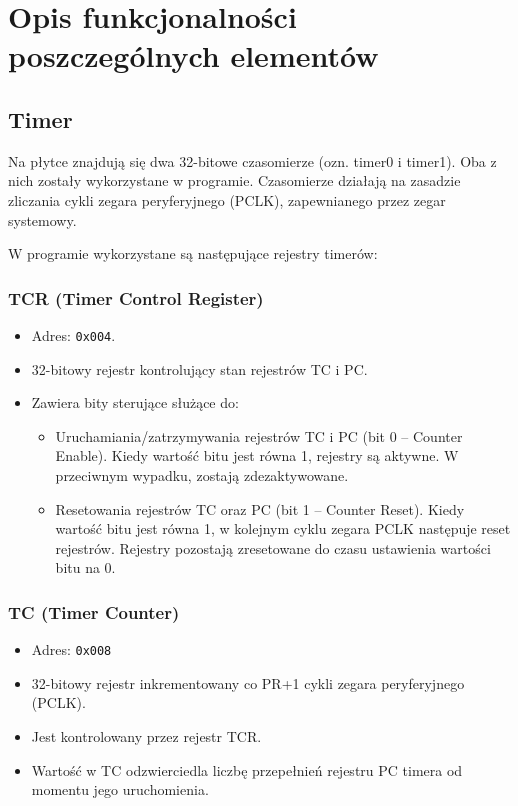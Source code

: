 \documentclass[a4paper,12pt]{report}
\begin{document}
\chapter{Opis funkcjonalności poszczególnych elementów}

\section{Timer}
Na płytce znajdują się dwa 32-bitowe czasomierze (ozn. timer0 i timer1). Oba z nich zostały wykorzystane w programie. Czasomierze działają na zasadzie zliczania cykli zegara peryferyjnego (PCLK), zapewnianego przez zegar systemowy.

W programie wykorzystane są następujące rejestry timerów:

\subsection{TCR (Timer Control Register)}
\begin{itemize}
    \item Adres: \texttt{0x004}.
    \item 32-bitowy rejestr kontrolujący stan rejestrów TC i PC.
    \item Zawiera bity sterujące służące do:
    \begin{itemize}
        \item Uruchamiania/zatrzymywania rejestrów TC i PC (bit 0 – Counter Enable). Kiedy wartość bitu jest równa 1, rejestry są aktywne. W przeciwnym wypadku, zostają zdezaktywowane.
        \item Resetowania rejestrów TC oraz PC (bit 1 – Counter Reset). Kiedy wartość bitu jest równa 1, w kolejnym cyklu zegara PCLK następuje reset rejestrów. Rejestry pozostają zresetowane do czasu ustawienia wartości bitu na 0.
    \end{itemize}
\end{itemize}

\subsection{TC (Timer Counter)}
\begin{itemize}
    \item Adres: \texttt{0x008}
    \item 32-bitowy rejestr inkrementowany co PR+1 cykli zegara peryferyjnego (PCLK).
    \item Jest kontrolowany przez rejestr TCR.
    \item Wartość w TC odzwierciedla liczbę przepełnień rejestru PC timera od momentu jego uruchomienia.
\end{itemize}
\end{document}
